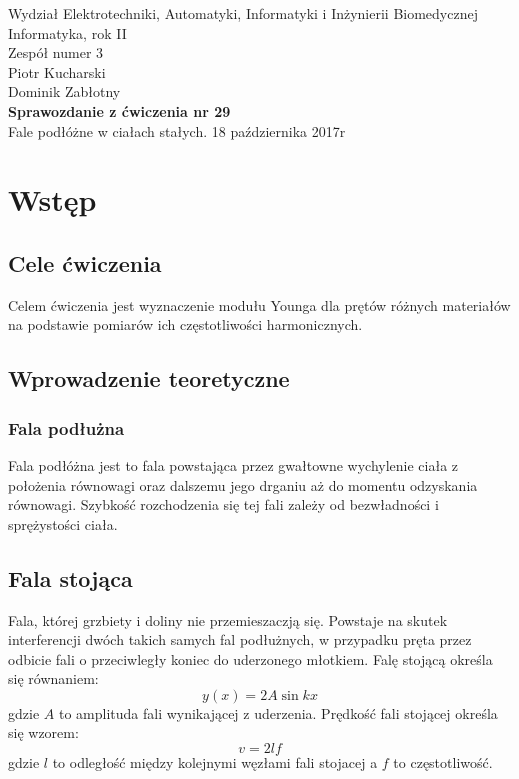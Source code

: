 \documentclass[a4paper,12pts]{article}
\begin{document}
	\thispagestyle{empty}
	\begin{flushleft}
		Wydział Elektrotechniki, Automatyki, Informatyki i Inżynierii Biomedycznej \\
		Informatyka, rok II \\
		Zespół numer 3 \\
		Piotr Kucharski \\
		Dominik Zabłotny \\
		\vspace*{\fill}
		{\large \textbf{Sprawozdanie z ćwiczenia nr 29} } \\
		Fale podłóżne w ciałach stałych.	
		\vfill	
		18 października 2017r
	\end{flushleft}
	
	\newpage
	

\section{Wstęp}

\subsection{Cele ćwiczenia}
Celem ćwiczenia jest wyznaczenie modułu Younga dla prętów różnych materiałów na podstawie pomiarów ich częstotliwości harmonicznych.

\subsection{Wprowadzenie teoretyczne}
\subsubsection{Fala podłużna}
Fala podłóżna jest to fala powstająca przez gwałtowne wychylenie ciała z położenia równowagi oraz dalszemu jego drganiu aż do momentu odzyskania równowagi. Szybkość rozchodzenia się tej fali zależy od bezwładności i sprężystości ciała.

\subsection{Fala stojąca}
Fala, której grzbiety i doliny nie przemieszaczją się. Powstaje na skutek interferencji dwóch takich samych fal podłużnych, w przypadku pręta przez odbicie fali o przeciwległy koniec do uderzonego młotkiem. Falę stojącą określa się równaniem:
\begin{equation}
y(x) = 2A \sin kx
\end{equation}
gdzie $A$ to amplituda fali wynikającej z uderzenia. Prędkość fali stojącej określa się wzorem:
\begin{equation}
	v = 2lf
\end{equation}
gdzie $l$ to odległość między kolejnymi węzłami fali stojacej a $f$ to częstotliwość.
\end{document}

